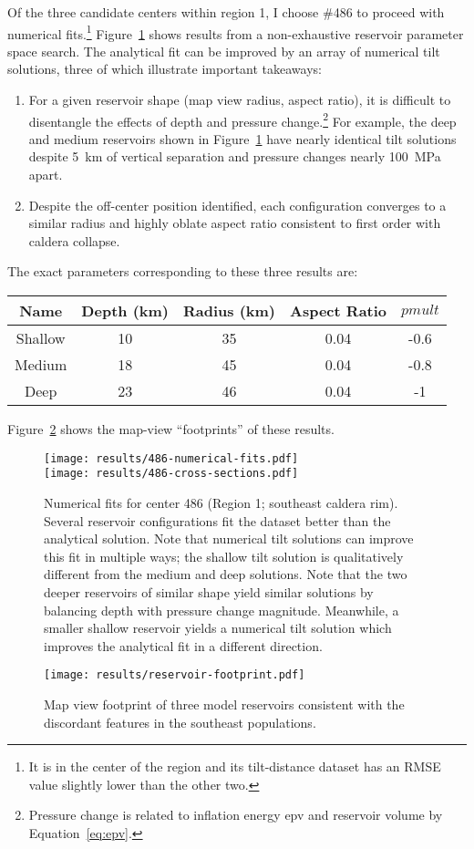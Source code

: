 Of the three candidate centers within region 1, I choose \#486 to proceed with numerical fits.\footnote{It is in the center of the region and its tilt-distance dataset has an \acs{RMSE} value slightly lower than the other two.} Figure~\ref{fig:486-numerical-fits} shows results from a non-exhaustive reservoir parameter space search. The analytical fit can be improved by an array of numerical tilt solutions, three of which illustrate important takeaways:
\begin{enumerate}
    \item For a given reservoir shape (map view radius, aspect ratio), it is difficult to disentangle the effects of depth and pressure change.\footnote{Pressure change is related to inflation energy \acs{epv} and reservoir volume by Equation~\eqref{eq:epv}.} For example, the deep and medium reservoirs shown in Figure~\ref{fig:486-numerical-fits} have nearly identical tilt solutions despite \qty{5}{km} of vertical separation and pressure changes nearly \qty{100}{\mega\Pa} apart. 
    \item Despite the off-center position identified, each configuration converges to a similar radius and highly oblate aspect ratio consistent to first order with caldera collapse.
\end{enumerate}

The exact parameters corresponding to these three results are:
\begin{center}
\begin{tabular}{ccccc}
    Name & Depth (km) & Radius (km) & Aspect Ratio & $pmult$\\
    \hline
    Shallow & 10 & 35 & 0.04 & -0.6\\
    Medium & 18 & 45 & 0.04 & -0.8\\
    Deep & 23 & 46 & 0.04 & -1
\end{tabular}
\end{center}
Figure~\ref{fig:reservoir-footprint} shows the map-view ``footprints'' of these results.

\begin{figure}
    \texttt{[image: results/486-numerical-fits.pdf]}\\
    \texttt{[image: results/486-cross-sections.pdf]}%
    \caption[Numerical parameter fits (center 486)]{Numerical fits for center 486 (Region 1; southeast caldera rim). Several reservoir configurations fit the dataset better than the analytical solution. Note that numerical tilt solutions can improve this fit in multiple ways; the shallow tilt solution is qualitatively different from the medium and deep solutions. Note that the two deeper reservoirs of similar shape yield similar solutions by balancing depth with pressure change magnitude. Meanwhile, a smaller shallow reservoir yields a numerical tilt solution which improves the analytical fit in a different direction.}
    \label{fig:486-numerical-fits}
\end{figure}

\begin{figure}
    \texttt{[image: results/reservoir-footprint.pdf]}
    \caption[Model reservoir footprint]{Map view footprint of three model reservoirs consistent with the discordant features in the southeast populations.}
    \label{fig:reservoir-footprint}
\end{figure}